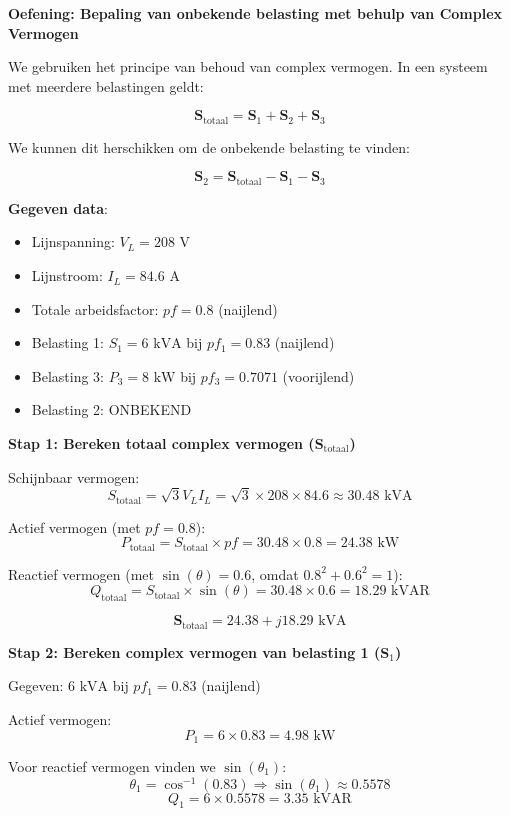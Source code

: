 \documentclass[a4paper,11pt]{article}
\begin{document}
\begin{oefenblok}

\textbf{Oefening: Bepaling van onbekende belasting met behulp van Complex Vermogen}

We gebruiken het principe van behoud van complex vermogen. In een systeem met meerdere belastingen geldt:

$$\mathbf{S}_{\text{totaal}} = \mathbf{S}_1 + \mathbf{S}_2 + \mathbf{S}_3$$

We kunnen dit herschikken om de onbekende belasting te vinden:

$$\mathbf{S}_2 = \mathbf{S}_{\text{totaal}} - \mathbf{S}_1 - \mathbf{S}_3$$

\textbf{Gegeven data}:
\begin{itemize}
    \item Lijnspanning: $V_L = 208 \text{ V}$
    \item Lijnstroom: $I_L = 84.6 \text{ A}$
    \item Totale arbeidsfactor: $pf = 0.8$ (naijlend)
    \item Belasting 1: $S_1 = 6 \text{ kVA}$ bij $pf_1 = 0.83$ (naijlend)
    \item Belasting 3: $P_3 = 8 \text{ kW}$ bij $pf_3 = 0.7071$ (voorijlend)
    \item Belasting 2: ONBEKEND
\end{itemize}

\textbf{Stap 1: Bereken totaal complex vermogen ($\mathbf{S}_{\text{totaal}}$)}

Schijnbaar vermogen:
$$S_{\text{totaal}} = \sqrt{3} V_L I_L = \sqrt{3} \times 208 \times 84.6 \approx 30.48 \text{ kVA}$$

Actief vermogen (met $pf = 0.8$):
$$P_{\text{totaal}} = S_{\text{totaal}} \times pf = 30.48 \times 0.8 = 24.38 \text{ kW}$$

Reactief vermogen (met $\sin(\theta) = 0.6$, omdat $0.8^2 + 0.6^2 = 1$):
$$Q_{\text{totaal}} = S_{\text{totaal}} \times \sin(\theta) = 30.48 \times 0.6 = 18.29 \text{ kVAR}$$

$$\mathbf{S}_{\text{totaal}} = 24.38 + j18.29 \text{ kVA}$$

\textbf{Stap 2: Bereken complex vermogen van belasting 1 ($\mathbf{S}_1$)}

Gegeven: $6 \text{ kVA}$ bij $pf_1 = 0.83$ (naijlend)

Actief vermogen:
$$P_1 = 6 \times 0.83 = 4.98 \text{ kW}$$

Voor reactief vermogen vinden we $\sin(\theta_1)$:
$$\theta_1 = \cos^{-1}(0.83) \Rightarrow \sin(\theta_1) \approx 0.5578$$
$$Q_1 = 6 \times 0.5578 = 3.35 \text{ kVAR}$$


\end{oefenblok}
\end{document}
